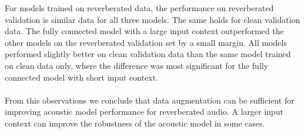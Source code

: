 For models trained on reverberated data, the performance on reverberated validation is similar data for all three models. The same holds for clean validation data. The fully connected model with a large input context outperformed the other models on the reverberated validation set by a small margin. All models performed slightly better on clean validation data than the same model trained on clean data only, where the difference was most significant for the fully connected model with short input context. \\ \\
From this observations we conclude that data augmentation can be sufficient for improving acoustic model performance for reverberated audio. A larger input context can improve the robustness of the acoustic model in some cases. 
\iffalse
TODO: Describe how we generated reverbed data
TODO: Describe how we tested on reverbed data
TODO: Describe final architecture and results

This chapter should summarize and interpret the results. It should give a clear insight
about which methods did decrease the FER and WER on reverbed and unreverbed data, respectivley.
\fi